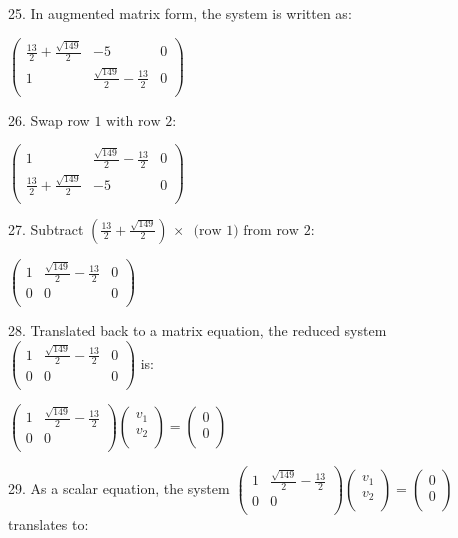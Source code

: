 \documentclass{article}
\begin{document}
25. In augmented matrix form, the system is written as:

$\left(
\begin{array}{ccc}
\frac{13}{2}+\frac{\sqrt{149}}{2} & -5 & 0 \\
 1 & \frac{\sqrt{149}}{2}-\frac{13}{2} & 0 \\
\end{array}
\right)$

26. Swap row $1\text{ with row }2:$

$\left(
\begin{array}{ccc}
1 & \frac{\sqrt{149}}{2}-\frac{13}{2} & 0 \\
 \frac{13}{2}+\frac{\sqrt{149}}{2} & -5 & 0 \\
\end{array}
\right)$

27. Subtract $\left(\frac{13}{2}+\frac{\sqrt{149}}{2}\right)\, \times \,\text{ (row }1)\text{ from row }2:$

$\left(
\begin{array}{ccc}
1 & \frac{\sqrt{149}}{2}-\frac{13}{2} & 0 \\
 0 & 0 & 0 \\
\end{array}
\right)$

28. Translated back to a matrix equation, the reduced system $\left(
\begin{array}{ccc}
1 & \frac{\sqrt{149}}{2}-\frac{13}{2} & 0 \\
 0 & 0 & 0 \\
\end{array}
\right)$ is:

$\left(
\begin{array}{cc}
1 & \frac{\sqrt{149}}{2}-\frac{13}{2} \\
 0 & 0 \\
\end{array}
\right)\left(
\begin{array}{c}
v_1 \\
 v_2 \\
\end{array}
\right)=\left(
\begin{array}{c}
0 \\
 0 \\
\end{array}
\right)$

29. As a scalar equation, the system $\left(
\begin{array}{cc}
1 & \frac{\sqrt{149}}{2}-\frac{13}{2} \\
 0 & 0 \\
\end{array}
\right)\left(
\begin{array}{c}
v_1 \\
 v_2 \\
\end{array}
\right)=\left(
\begin{array}{c}
0 \\
 0 \\
\end{array}
\right)$ translates to:
\end{document}
